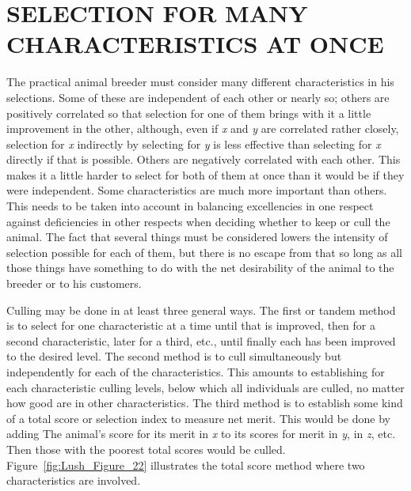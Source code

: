 \section*{SELECTION FOR MANY CHARACTERISTICS AT ONCE}

The practical animal breeder must consider many different characteristics
in his selections. Some of these are independent of each other
or nearly so; others are positively correlated so that selection for one of
them brings with it a little improvement in the other, although, even if
\textit{x} and \textit{y} are correlated rather closely, selection for \textit{x} indirectly by
selecting for \textit{y} is less effective than selecting for \textit{x} directly if that is possible.
Others are negatively correlated with each other. This makes it a little
harder to select for both of them at once than it would be if they were
independent. Some characteristics are much more important than others.
This needs to be taken into account in balancing excellencies in one
respect against deficiencies in other respects when deciding whether to
keep or cull the animal. The fact that several things must be considered
lowers the intensity of selection possible for each of them, but there is
no escape from that so long as all those things have something to do
with the net desirability of the animal to the breeder or to his
customers.

Culling may be done in at least three general ways. The first or tandem
method is to select for one characteristic at a time until that is
improved, then for a second characteristic, later for a third, etc., until
finally each has been improved to the desired level. The second method
is to cull simultaneously but independently for each of the characteristics.
This amounts to establishing for each characteristic culling levels,
below which all individuals are culled, no matter how good are in
other characteristics. The third method is to establish some kind of a
total score or selection index to measure net merit. This would be done
by adding The animal's score for its merit in \textit{x} to its scores for merit in \textit{y},
in \textit{z}, etc. Then those with the poorest total scores would be culled.
Figure~\ref{fig:Lush_Figure_22} illustrates the total score method where two characteristics are
involved.

